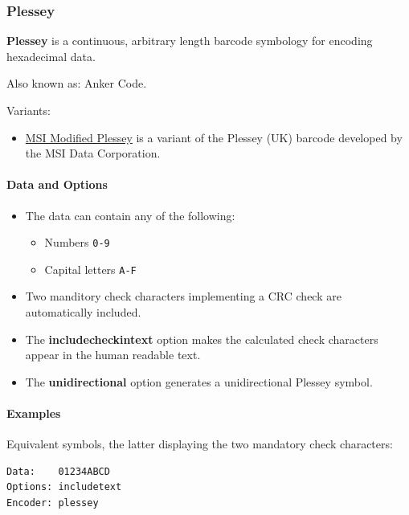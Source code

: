 \hypertarget{plessey}{%
\subsubsection{Plessey}\label{plessey}}

\textbf{Plessey} is a continuous, arbitrary length barcode symbology for
encoding hexadecimal data.

Also known as: Anker Code.

Variants:

\begin{itemize}
\tightlist
\item
  \protect\hyperlink{msi-plessey}{MSI Modified Plessey} is a variant of
  the Plessey (UK) barcode developed by the MSI Data Corporation.
\end{itemize}

\hypertarget{data-and-options-75}{%
\paragraph{Data and Options}\label{data-and-options-75}}

\begin{itemize}
\tightlist
\item
  The data can contain any of the following:

  \begin{itemize}
  \tightlist
  \item
    Numbers \texttt{0-9}
  \item
    Capital letters \texttt{A-F}
  \end{itemize}
\item
  Two manditory check characters implementing a CRC check are
  automatically included.
\item
  The \textbf{includecheckintext} option makes the calculated check
  characters appear in the human readable text.
\item
  The \textbf{unidirectional} option generates a unidirectional Plessey
  symbol.
\end{itemize}

\hypertarget{examples-49}{%
\paragraph{Examples}\label{examples-49}}

Equivalent symbols, the latter displaying the two mandatory check
characters:

\begin{verbatim}
Data:    01234ABCD
Options: includetext
Encoder: plessey
\end{verbatim}

